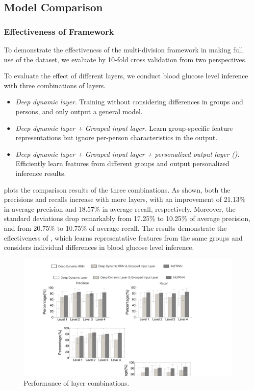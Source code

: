 \subsection{Model Comparison}

\subsubsection{Effectiveness of \modelname Framework}
\textcolor[rgb]{1.00,0.00,0.00}{To demonstrate the effectiveness of the multi-division framework in making full use of the dataset, we evaluate \modelname by 10-fold cross validation \cite{bib:refaeilzadeh2009cross} from two perspectives.}

To evaluate the effect of different layers, we conduct blood glucose level inference with three combinations of layers.
\begin{itemize}
  \item
  \emph{Deep dynamic layer.}
  Training without considering differences in groups and persons, and only output a general model.
  \item
  \emph{Deep dynamic layer + Grouped input layer.}
  Learn group-specific feature representations but ignore per-person characteristics in the output.
  \item
  \emph{Deep dynamic layer + Grouped input layer + personalized output layer (\modelname).}
  Efficiently learn features from different groups and output personalized inference results.
\end{itemize}
 plots the comparison results of the three combinations.
As shown, both the precisions and recalls increase with more layers, with an improvement of 21.13\% in average precision and 18.57\% in average recall, respectively.
Moreover, the standard deviations drop remarkably from 17.25\% to 10.25\%  of average precision, and from 20.75\% to 10.75\% of average recall.
The results demonstrate the effectiveness of \modelname, which learns representative features from the same groups and considers individual differences in blood glucose level inference.

\begin{figure}[h]
  \centering
  \includegraphics[width=0.9\columnwidth]{./img/CMP_Models2.pdf}
  \caption{Performance of layer combinations.}
  \label{fig:cmp_model}
\end{figure}

